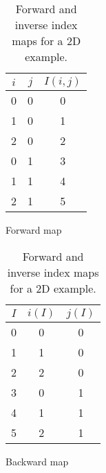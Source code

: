 \begin{table}[ht!]
    \centering
    \begin{subfigure}{0.45\textwidth}
        \centering
    \begin{tabular}{c c | c}
        \toprule $i$ & $j$ & $I(i,j)$ \\ \midrule
        0 & 0 & 0 \\
        1 & 0 & 1 \\
        2 & 0 & 2 \\
        0 & 1 & 3 \\
        1 & 1 & 4 \\
        2 & 1 & 5 \\ \bottomrule
    \end{tabular}
    \caption{Forward map}
    \end{subfigure}
    \begin{subfigure}{0.45\textwidth}
        \centering
    \begin{tabular}{c | c c}
        \toprule $I$ & $i(I)$ & $j(I)$ \\ \midrule
        0 & 0 & 0 \\
        1 & 1 & 0 \\
        2 & 2 & 0 \\
        3 & 0 & 1 \\
        4 & 1 & 1 \\
        5 & 2 & 1 \\ \bottomrule
    \end{tabular}
    \caption{Backward map}
    \end{subfigure}
    \caption{Forward and inverse index maps for a 2D example.}
\end{table}

